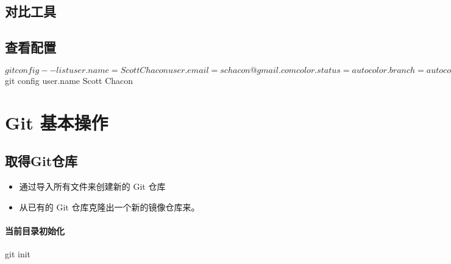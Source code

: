 \subsection{对比工具}


\subsection{查看配置}
\begin{CMD}
$ git config --list
user.name=Scott Chacon
user.email=schacon@gmail.com
color.status=auto
color.branch=auto
color.interactive=auto
color.diff=auto
$git config user.name
Scott Chacon
\end{CMD}

\section{Git 基本操作}

\subsection{取得Git仓库}
\begin{itemize}
\item 通过导入所有文件来创建新的 Git 仓库
\item 从已有的 Git 仓库克隆出一个新的镜像仓库来。
\end{itemize}

\paragraph{当前目录初始化}
\begin{CMD}
git init
\end{CMD}